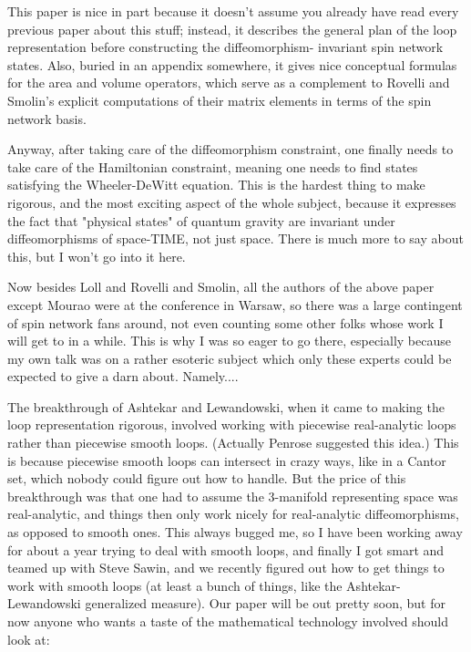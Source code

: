 This paper is nice in part because it doesn't assume you already have read
every previous paper about this stuff; instead, it describes the general plan
of the loop representation before constructing the diffeomorphism-
invariant spin network states.  Also, buried in an appendix somewhere, it
gives nice conceptual formulas for the area and volume operators, which 
serve as a complement to Rovelli and Smolin's explicit computations of 
their matrix elements in terms of the spin network basis.  

Anyway, after taking care of the diffeomorphism constraint, one
finally needs to take care of the Hamiltonian constraint, meaning
one needs to find states satisfying the Wheeler-DeWitt equation.  This is the
hardest thing to make rigorous, and the most exciting aspect of
the whole subject, because it expresses the fact that "physical
states" of quantum gravity are invariant under diffeomorphisms
of space-TIME, not just space.  There is much more to say about this,
but I won't go into it here.

Now besides Loll and Rovelli and Smolin, all the authors of the above
paper except Mourao were at the conference in Warsaw, so there was a 
large contingent of spin network fans around, not even counting some
other folks whose work I will get to in a while.  This is why I was so
eager to go there, especially because my own talk was on a rather esoteric
subject which only these experts could be expected to give a darn about.  
Namely....

The breakthrough of Ashtekar and Lewandowski, when it came to making the 
loop representation rigorous, involved working with piecewise real-analytic 
loops rather than piecewise smooth loops.  (Actually Penrose suggested this 
idea.)  This is because piecewise smooth loops can intersect in crazy ways, 
like in a Cantor set, which nobody could figure out how to handle.  But the 
price of this breakthrough was that one had to assume the 3-manifold 
representing space was real-analytic, and things then only work nicely for 
real-analytic diffeomorphisms, as opposed to smooth ones.  This always 
bugged me, so I have been working away for about a year trying to deal with 
smooth loops, and finally I got smart and teamed up with Steve Sawin, and 
we recently figured out how to get things to work with smooth loops (at least a 
bunch of things, like the Ashtekar-Lewandowski generalized measure).  Our 
paper will be out pretty soon, but for now anyone who wants a taste of the 
mathematical technology involved should look at:

